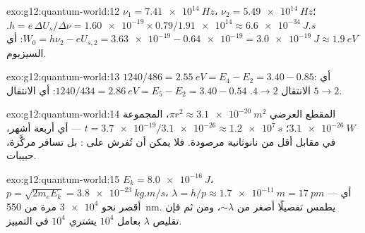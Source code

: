 \begin{solution}{exo:g12:quantum-world:12}
$\nu_1 = \qty{7.41e14}{Hz}$، $\nu_2 = \qty{5.49e14}{Hz}$؛
$h = e\,\Delta U_s/\Delta\nu = \num{1.60e-19} \times 0.79 /
\num{1.91e14} \approx \qty{6.6e-34}{J.s}$. $W_0 = h\nu_2 - eU_{s,2} =
\num{3.63e-19} - \num{0.64e-19} = \qty{3.0e-19}{J} \approx
\qty{1.9}{eV}$: أي السيزيوم.
\end{solution}

\begin{solution}{exo:g12:quantum-world:13}
$1240/486 = \qty{2.55}{eV} = E_4 - E_2 = 3.40 - 0.85$: أي الانتقال
$4 \to 2$. $1240/434 = \qty{2.86}{eV} = E_5 - E_2 = 3.40 - 0.54$:
أي الانتقال $5 \to 2$.
\end{solution}

\begin{solution}{exo:g12:quantum-world:14}
المقطع العرضي $\pi r^2 \approx \qty{3.1e-20}{m^2}$،  المجموعة
$\qty{3.1e-26}{W}$؛ $t = \num{3.7e-19}/\num{3.1e-26} \approx
\qty{1.2e7}{s}$ --- أي أربعة أشهر، في مقابل أقل من نانوثانية مرصودة.
فلا يمكن أن تُفرش  على : بل تسافر
مركَّزة، حبيبات.
\end{solution}

\begin{solution}{exo:g12:quantum-world:15}
$E_k = \qty{8.0e-16}{J}$، $p = \sqrt{2m_e E_k} =
\qty{3.8e-23}{kg.m/s}$، $\lambda = h/p \approx \qty{1.7e-11}{m} =
\qty{17}{pm}$ --- أي أقصر نحو $\num{3e4}$ مرة من \qty{550}{nm}.
 يطمس تفصيلًا أصغر من $\sim\lambda$، ومن ثم فإن تقليص
$\lambda$ بعامل $10^4$ يشتري $10^4$ في التمييز.
\end{solution}

